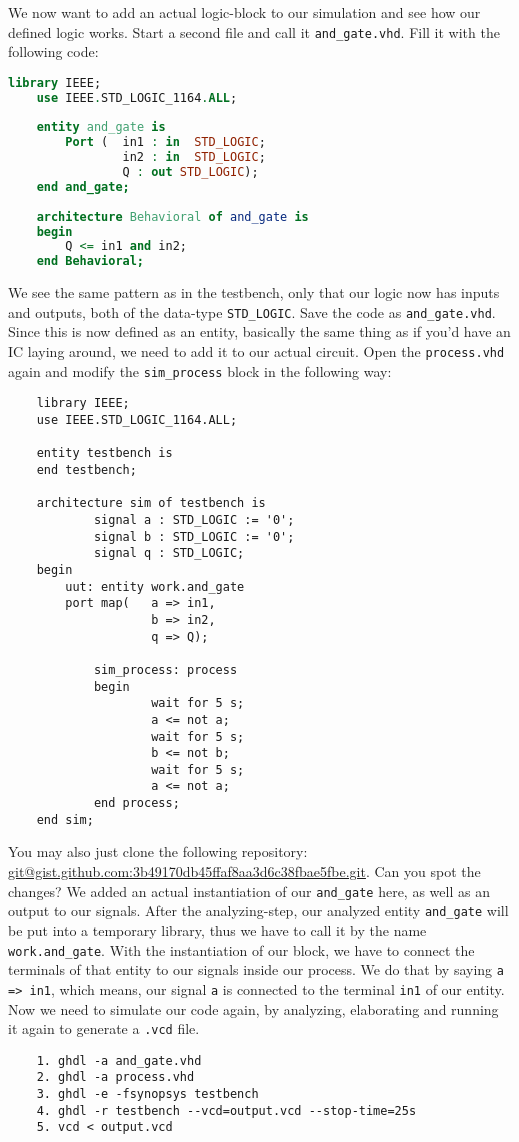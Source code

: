 \documentclass{dcbl/challenge}
\begin{document}
\begin{aufgabe}
    We now want to add an actual logic-block to our simulation and see how our defined logic works.
    Start a second file and call it \texttt{and\_gate.vhd}.
    Fill it with the following code:
    \begin{lstlisting}[language=VHDL]
    library IEEE;
    use IEEE.STD_LOGIC_1164.ALL;
    
    entity and_gate is
        Port (  in1 : in  STD_LOGIC;
                in2 : in  STD_LOGIC;
                Q : out STD_LOGIC);
    end and_gate;
    
    architecture Behavioral of and_gate is
    begin
        Q <= in1 and in2;
    end Behavioral;
    \end{lstlisting}
    We see the same pattern as in the testbench, only that our logic now has inputs and outputs, both of the data-type \texttt{STD\_LOGIC}.
    Save the code as \texttt{and\_gate.vhd}.
    Since this is now defined as an entity, basically the same thing as if you'd have an IC laying around, we need to add it to our actual circuit.
    Open the \texttt{process.vhd} again and modify the \texttt{sim\_process} block in the following way:
    \begin{lstlisting}
    library IEEE;
    use IEEE.STD_LOGIC_1164.ALL;

    entity testbench is
    end testbench;

    architecture sim of testbench is
            signal a : STD_LOGIC := '0';
            signal b : STD_LOGIC := '0';
            signal q : STD_LOGIC;
    begin
        uut: entity work.and_gate
        port map(   a => in1,
                    b => in2,
                    q => Q);

            sim_process: process
            begin
                    wait for 5 s;
                    a <= not a;
                    wait for 5 s;
                    b <= not b;
                    wait for 5 s;
                    a <= not a;
            end process;
    end sim;
    \end{lstlisting}
    You may also just clone the following repository: \url{git@gist.github.com:3b49170db45ffaf8aa3d6c38fbae5fbe.git}.
    Can you spot the changes? 
    We added an actual instantiation of our \texttt{and\_gate} here, as well as an output to our signals. 
    After the analyzing-step, our analyzed entity \texttt{and\_gate} will be put into a temporary library, thus we have to call it by the name \texttt{work.and\_gate}.
    With the instantiation of our block, we have to connect the terminals of that entity to our signals inside our process.
    We do that by saying \texttt{a => in1}, which means, our signal \texttt{a} is connected to the terminal \texttt{in1} of our entity.
    Now we need to simulate our code again, by analyzing, elaborating and running it again to generate a \texttt{.vcd} file.
    \begin{lstlisting}
    1. ghdl -a and_gate.vhd
    2. ghdl -a process.vhd
    3. ghdl -e -fsynopsys testbench
    4. ghdl -r testbench --vcd=output.vcd --stop-time=25s
    5. vcd < output.vcd
    \end{lstlisting}
\end{aufgabe}
\end{document}
